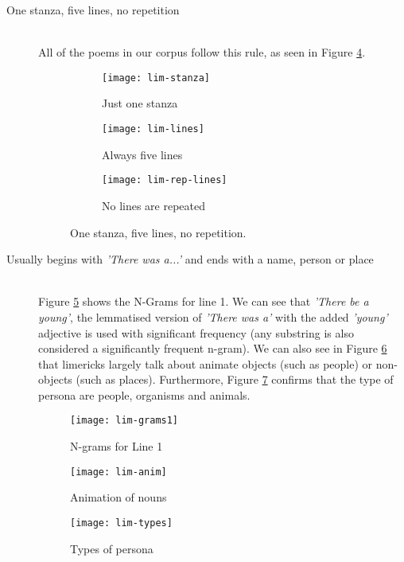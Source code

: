\begin{description}
\item[One stanza, five lines, no repetition]  \hfill \\
All of the poems in our corpus follow this rule, as seen in Figure \ref{fig:lim1}.
\begin{figure}[H]
\centering
\begin{subfigure}[t]{0.3\textwidth}
	\centering
    \texttt{[image: lim-stanza]}
    \caption{Just one stanza}
    \label{fig:lim-stanza}
\end{subfigure}
\begin{subfigure}[t]{0.3\textwidth}
	\centering
    \texttt{[image: lim-lines]}
    \caption{Always five lines}
    \label{fig:lim-lines}
\end{subfigure}
\begin{subfigure}[t]{0.3\textwidth}
	\centering
    \texttt{[image: lim-rep-lines]}
    \caption{No lines are repeated}
    \label{fig:lim-rep-lines}
\end{subfigure}
\caption{One stanza, five lines, no repetition.}
\label{fig:lim1}
\end{figure}


\item[Usually begins with \textit{'There was a...'} and ends with a name, person or place]  \hfill \\
Figure \ref{fig:lim-grams1} shows the N-Grams for line 1. We can see that \textit{'There be a young'}, the lemmatised version of \textit{'There was a'} with the added \textit{'young'} adjective is used with significant frequency (any substring is also considered a significantly frequent n-gram). We can also see in Figure \ref{fig:lim-anim} that limericks largely talk about animate objects (such as people) or non-objects (such as places). Furthermore, Figure \ref{fig:lim-types} confirms that the type of persona are people, organisms and animals.

\begin{figure}[H]
\centering
\texttt{[image: lim-grams1]}
\caption{N-grams for Line 1}
\label{fig:lim-grams1}
\end{figure}

\begin{figure}[H]
\centering
\texttt{[image: lim-anim]}
\caption{Animation of nouns}
\label{fig:lim-anim}
\end{figure}

\begin{figure}[H]
\centering
\texttt{[image: lim-types]}
\caption{Types of persona}
\label{fig:lim-types}
\end{figure}


\end{description}
